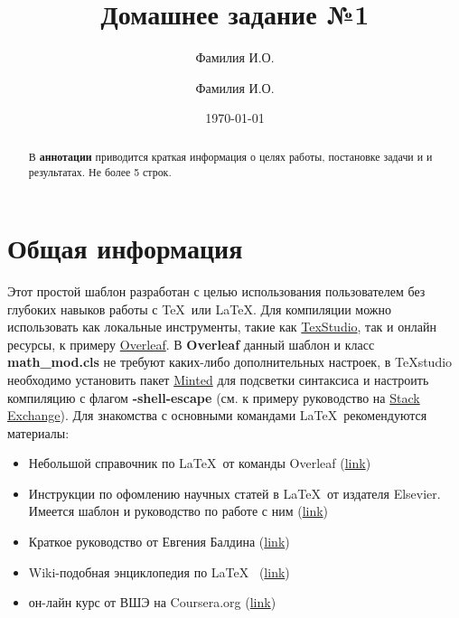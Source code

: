 \documentclass[FN]{math_mod}
\title{Домашнее задание №1}
\author{Фамилия И.О. \\ \email{emailauthor2@ua.pt}  \and Фамилия И.О. \\ \email{emailauthor2@ua.pt} }
\date{\today}
\begin{document}
\maketitle

\begin{abstract}

В \textbf{аннотации} приводится краткая информация о целях работы, постановке задачи и и результатах. Не более 5 строк.  

\end{abstract}

\section{Общая информация}
Этот простой шаблон разработан с целью использования пользователем без глубоких навыков работы с \TeX~или \LaTeX. Для компиляции можно использовать как локальные инструменты, такие как \href{https://www.texstudio.org/}{TexStudio}, так и онлайн ресурсы, к примеру \href{https://www.overleaf.com/}{Overleaf}. В \textbf{Overleaf} данный шаблон и класс \textbf{math\_mod.cls} не требуют каких-либо дополнительных настроек, в TeXstudio необходимо установить пакет \href{https://www.ctan.org/pkg/minted}{Minted} для подсветки синтаксиса и настроить компиляцию с флагом \textbf{-shell-escape} (см. к примеру руководство на \href{https://tex.stackexchange.com/questions/99475/how-to-invoke-latex-with-the-shell-escape-flag-in-texstudio-former-texmakerx}{Stack Exchange}). Для знакомства с основными командами \LaTeX~рекомендуются материалы:
\begin{itemize}
    \item Небольшой справочник по \LaTeX~от команды Overleaf   (\href{https://ru.overleaf.com/learn/latex/Main_Page}{link})
    \item Инструкции по офомлению научных статей в \LaTeX~от издателя Elsevier. Имеется шаблон и руководство по работе с ним (\href{https://www.elsevier.com/authors/author-schemas/latex-instructions}{link}) 
    \item Краткое руководство от Евгения Балдина  (\href{https://www.ibm.com/developerworks/ru/library/latex_tutorial_01/index.html}{link}) 
    \item Wiki-подобная энциклопедия по \LaTeX~ (\href{https://ru.wikibooks.org/wiki/LaTeX}{link}) 
    \item он-лайн курс от ВШЭ на Coursera.org (\href{https://www.coursera.org/learn/latex}{link}) 
\end{itemize}
\end{document}
